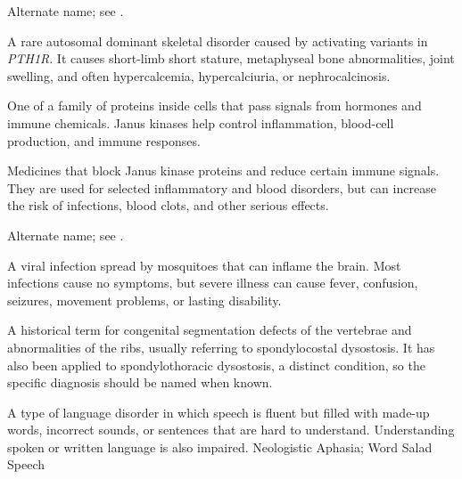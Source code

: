  Alternate name; see .

 A rare autosomal dominant skeletal disorder caused by activating variants in \textit{PTH1R}. It causes short-limb short stature, metaphyseal bone abnormalities, joint swelling, and often hypercalcemia, hypercalciuria, or nephrocalcinosis.

 One of a family of proteins inside cells that pass signals from hormones and immune chemicals. Janus kinases help control inflammation, blood-cell production, and immune responses.

 Medicines that block Janus kinase proteins and reduce certain immune signals. They are used for selected inflammatory and blood disorders, but can increase the risk of infections, blood clots, and other serious effects.

 Alternate name; see .

 A viral infection spread by mosquitoes that can inflame the brain. Most infections cause no symptoms, but severe illness can cause fever, confusion, seizures, movement problems, or lasting disability.

 A historical term for congenital segmentation defects of the vertebrae and abnormalities of the ribs, usually referring to spondylocostal dysostosis. It has also been applied to spondylothoracic dysostosis, a distinct condition, so the specific diagnosis should be named when known.

 A type of language disorder in which speech is fluent but filled with made-up words, incorrect sounds, or sentences that are hard to understand. Understanding spoken or written language is also impaired.
\synonyms
Neologistic Aphasia; Word Salad Speech

